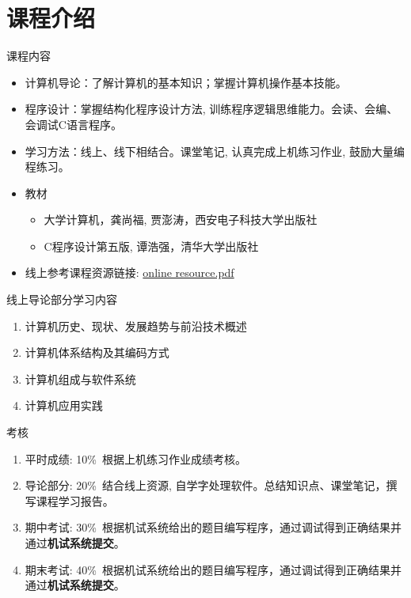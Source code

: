 
\section{课程介绍}

\begin{frame}[shrink]{课程内容}
\begin{itemize}
	\item 计算机导论：了解计算机的基本知识；掌握计算机操作基本技能。
	\item 程序设计：掌握结构化程序设计方法, 训练程序逻辑思维能力。会读、会编、会调试C语言程序。
	\item 学习方法：线上、线下相结合。课堂笔记, 认真完成上机练习作业, 鼓励大量编程练习。
	\item 教材
	\begin{itemize}
		\item 大学计算机，龚尚福, 贾澎涛，西安电子科技大学出版社
		\item C程序设计第五版, 谭浩强，清华大学出版社
	\end{itemize}
	\item 线上参考课程资源链接:
	\href{./online resource.pdf}{online resource.pdf} %
\end{itemize}
\end{frame}

\begin{frame}{线上导论部分学习内容}
\begin{enumerate}
	\setlength{\itemsep}{.8cm}
	\item 计算机历史、现状、发展趋势与前沿技术概述
	\item 计算机体系结构及其编码方式
	\item 计算机组成与软件系统
	\item 计算机应用实践
\end{enumerate}
\end{frame}

\begin{frame}{考核}
\begin{enumerate}
	\setlength{\itemsep}{.5cm}
	\item 平时成绩: 10\%~根据上机练习作业成绩考核。
	\item 导论部分: 20\%~结合线上资源, 自学字处理软件。总结知识点、课堂笔记，撰写课程学习报告。
	\item 期中考试: 30\%~根据机试系统给出的题目编写程序，通过调试得到正确结果并通过\textbf{机试系统提交}。
	\item 期末考试: 40\%~根据机试系统给出的题目编写程序，通过调试得到正确结果并通过\textbf{机试系统提交}。
\end{enumerate}
\end{frame}

